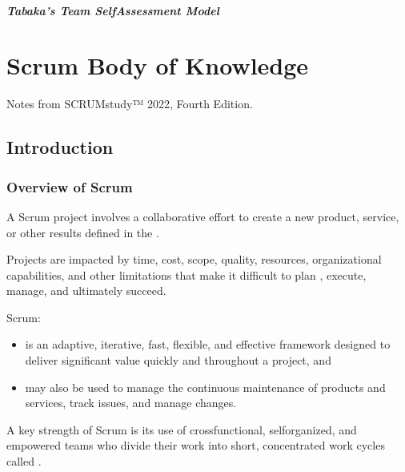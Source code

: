 \documentclass[letterpaper,10pt,english]{jupyterBook}
\begin{document}
\paragraph{Tabaka’s Team Self\sphinxhyphen{}Assessment Model}
\label{\detokenize{APM/agile:tabaka-s-team-self-assessment-model}}
\sphinxstepscope


\chapter{Scrum Body of Knowledge}
\label{\detokenize{APM/sbok:scrum-body-of-knowledge}}\label{\detokenize{APM/sbok::doc}}
\sphinxAtStartPar
Notes from SCRUMstudy™ 2022,  Fourth Edition.


\section{Introduction}
\label{\detokenize{APM/sbok:introduction}}

\subsection{Overview of Scrum}
\label{\detokenize{APM/sbok:overview-of-scrum}}
\sphinxAtStartPar
A Scrum project involves a collaborative effort to create a new product, service, or other results defined in the .

\sphinxAtStartPar
Projects are impacted by time, cost, scope, quality, resources, organizational capabilities, and other limitations that make it difficult to plan , execute, manage, and ultimately succeed.

\sphinxAtStartPar
Scrum:
\begin{itemize}
\item {} 
\sphinxAtStartPar
is an adaptive, iterative, fast, flexible, and effective framework designed to deliver significant value quickly and throughout a project, and

\item {} 
\sphinxAtStartPar
may also be used to manage the continuous maintenance of products and services, track issues, and manage changes.

\end{itemize}

\sphinxAtStartPar
A key strength of Scrum is its use of cross\sphinxhyphen{}functional, self\sphinxhyphen{}organized, and empowered teams who divide their work into short, concentrated work cycles called .
\end{document}
